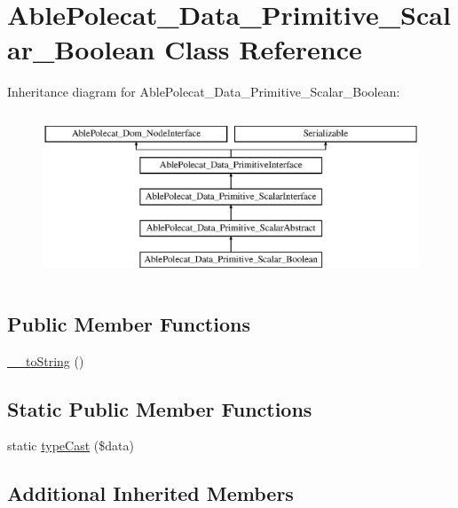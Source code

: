 \hypertarget{class_able_polecat___data___primitive___scalar___boolean}{}\section{Able\+Polecat\+\_\+\+Data\+\_\+\+Primitive\+\_\+\+Scalar\+\_\+\+Boolean Class Reference}
\label{class_able_polecat___data___primitive___scalar___boolean}
Inheritance diagram for Able\+Polecat\+\_\+\+Data\+\_\+\+Primitive\+\_\+\+Scalar\+\_\+\+Boolean\+:\begin{figure}[H]
\begin{center}
\leavevmode
\includegraphics[height=5.000000cm]{class_able_polecat___data___primitive___scalar___boolean}
\end{center}
\end{figure}
\subsection*{Public Member Functions}
\begin{DoxyCompactItemize}
\item 
\hyperlink{class_able_polecat___data___primitive___scalar___boolean_a7516ca30af0db3cdbf9a7739b48ce91d}{\+\_\+\+\_\+to\+String} ()
\end{DoxyCompactItemize}
\subsection*{Static Public Member Functions}
\begin{DoxyCompactItemize}
\item 
static \hyperlink{class_able_polecat___data___primitive___scalar___boolean_a68640750b79d1cdda3cddcece68a207e}{type\+Cast} (\$data)
\end{DoxyCompactItemize}
\subsection*{Additional Inherited Members}


